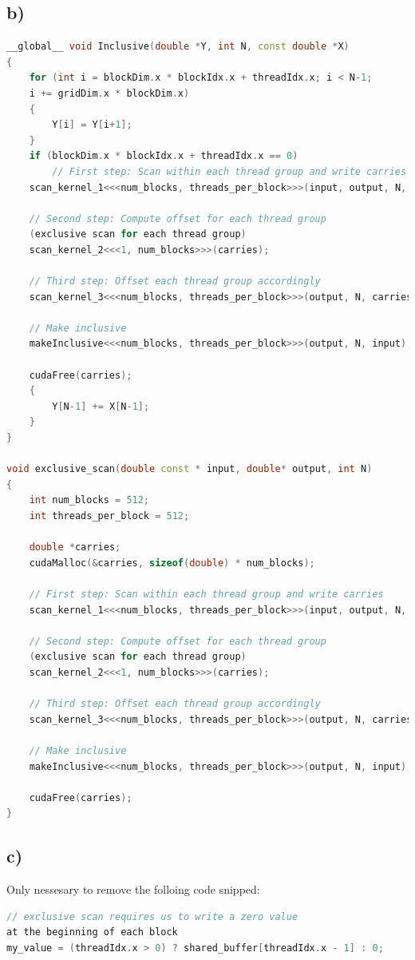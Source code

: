 \documentclass[11pt,a4paper]{article}
\begin{document}
\subsection*{b)}
\begin{lstlisting}[language=C++, caption={kernel for inclusive\_scan)}]
__global__ void Inclusive(double *Y, int N, const double *X)
{
	for (int i = blockDim.x * blockIdx.x + threadIdx.x; i < N-1; 
	i += gridDim.x * blockDim.x) 
	{
		Y[i] = Y[i+1];
	}
	if (blockDim.x * blockIdx.x + threadIdx.x == 0)
		// First step: Scan within each thread group and write carries
	scan_kernel_1<<<num_blocks, threads_per_block>>>(input, output, N, carries);
	
	// Second step: Compute offset for each thread group 
	(exclusive scan for each thread group)
	scan_kernel_2<<<1, num_blocks>>>(carries);
	
	// Third step: Offset each thread group accordingly
	scan_kernel_3<<<num_blocks, threads_per_block>>>(output, N, carries);
	
	// Make inclusive
	makeInclusive<<<num_blocks, threads_per_block>>>(output, N, input);
	
	cudaFree(carries);
	{
		Y[N-1] += X[N-1];
	}		
}

void exclusive_scan(double const * input, double* output, int N)
{
	int num_blocks = 512;
	int threads_per_block = 512;

	double *carries;
	cudaMalloc(&carries, sizeof(double) * num_blocks);

	// First step: Scan within each thread group and write carries
	scan_kernel_1<<<num_blocks, threads_per_block>>>(input, output, N, carries);
	
	// Second step: Compute offset for each thread group 
	(exclusive scan for each thread group)
	scan_kernel_2<<<1, num_blocks>>>(carries);
	
	// Third step: Offset each thread group accordingly
	scan_kernel_3<<<num_blocks, threads_per_block>>>(output, N, carries);
	
	// Make inclusive
	makeInclusive<<<num_blocks, threads_per_block>>>(output, N, input);
	
	cudaFree(carries);
}
\end{lstlisting}
\subsection*{c)}
Only nessesary to remove the folloing code snipped:
\begin{lstlisting}[language=C++, caption={kernel for inclusive\_scan)}]
// exclusive scan requires us to write a zero value
at the beginning of each block
my_value = (threadIdx.x > 0) ? shared_buffer[threadIdx.x - 1] : 0;
\end{lstlisting}
\end{document}

